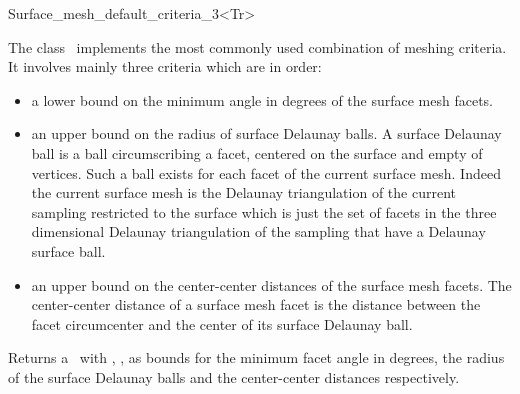 
\begin{ccRefClass}{Surface_mesh_default_criteria_3<Tr>}

\ccDefinition
  
The class \ccRefName\  implements  the most commonly used combination
of meshing criteria. It involves mainly three criteria which are
in order: 
\begin{itemize}
\item
a lower bound on the minimum angle in degrees of the surface mesh facets. \\
\item an upper bound on the radius of surface Delaunay balls.
 A surface Delaunay ball is a  ball circumscribing  a facet,
centered on the surface and empty of vertices.
 Such a ball exists for each facet
of the current surface mesh.
Indeed  the current surface mesh
is  the Delaunay triangulation of the current sampling restricted to
the surface 
which is just the set of facets in the three dimensional  Delaunay triangulation of
the sampling  that  have a Delaunay surface ball. \\
\item an upper bound on the center-center distances of the surface mesh facets.
  The center-center distance of a surface mesh facet 
  is the distance between the facet circumcenter and the 
  center of its  surface Delaunay ball. 
\end{itemize}


\ccIsModel


\ccTypes


\ccCreation
{}

{Returns a \ccRefName\ with , ,
 as bounds for the minimum facet angle in degrees,
the radius of the surface Delaunay balls 
and the center-center distances respectively.}

\ccSeeAlso


\end{ccRefClass}


